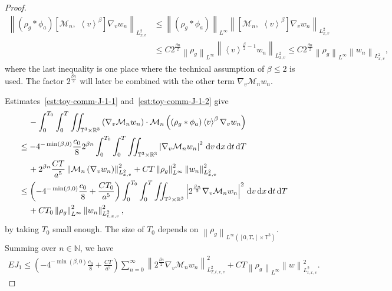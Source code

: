 \documentclass[11pt,american, reqno]{amsart}
\numberwithin{equation}{section}
\newcommand{\N}{\mathbb N}
\newcommand{\R}{\mathbb R}
\newcommand{\1}{\mathds{1}}
\newcommand{\dt}{\, {\rm d} t}
\newcommand{\dT}{\, {\rm d} T}
\newcommand{\dv}{\, {\rm d} v}
\newcommand{\dx}{\, {\rm d} x}
\newcommand{\CalM}{\mathcal{M}}
\newcommand{\vpran}[1]{\left(#1\right)}
\newcommand{\nn}{\nonumber}
\newcommand{\norm}[1]{\left\lVert#1\right\rVert}
\newcommand{\abs}[1]{\left\vert#1\right\vert}
\newcommand{\vint}[1]{\left\langle#1\right\rangle}
\newcommand{\T}{\mathbb{T}}
\numberwithin{equation}{section}
\begin{document}
\begin{proof}
\begin{align} \label{est:toy-comm-J-1-2}
 \norm{\vpran{\rho_g \ast \phi_a} [\CalM_n, \,\, \vint{v}^\beta] \nabla_v w_n}_{L^2_{x,v}}
&\leq 
 \norm{\vpran{\rho_g \ast \phi_a}}_{L^\infty}
 \norm{[\CalM_n, \,\, \vint{v}^\beta] \nabla_v w_n}_{L^2_{x,v}}
\\
&\leq
 C 2^{\frac{\beta n}{2}} \norm{\rho_g}_{L^\infty}
 \norm{\vint{v}^{\frac{\beta}{2}-1}w_n}_{L^2_{x,v}}
\leq
  C 2^{\frac{\beta n}{2}} \norm{\rho_g}_{L^\infty}
\norm{w_n}_{L^2_{x,v}}, \nn
\end{align}
where the last inequality is one place where the technical assumption of $\beta \leq 2$ is used. The factor $2^{\frac{\beta n}{2}}$ will later be combined with the other term $\nabla_v \CalM_n w_n$.

Estimates~\eqref{est:toy-comm-J-1-1} and~\eqref{est:toy-comm-J-1-2} give
\begin{align} \label{est:toy-J-1}
& \quad \,
 - \int_0^{T_0} \int_0^T \iint_{\T^3 \times \R^3}
   \vpran{\nabla_v \CalM_n w_n} \cdot
\CalM_n \vpran{\vpran{\rho_g \ast \phi_a} \vint{v}^\beta \nabla_v w_n} \nn
\\
& \leq 
 - 4^{-\min(\beta, 0)} \frac{c_0}{8} 2^{\beta n}
   \int_0^{T_0} \int_0^T \iint_{\T^3 \times \R^3}
   \abs{\nabla_v \CalM_n w_n}^2 \dv \dx \dt \dT \nn
\\
& \quad \,
 + 2^{\beta n} 
 \frac{C T}{a^5} \norm{\CalM_n \vpran{\nabla_v w_n}}_{L^2_{x, v}}^2
 + C T \norm{\rho_g}_{L^\infty}^2
 \norm{w_n}^2_{L^2_{x,v}} \nn
\\
& \leq 
 \vpran{- 4^{-\min(\beta, 0)} \frac{c_0}{8} 
 + \frac{C T_0}{a^5}}
   \int_0^{T_0} \int_0^T \iint_{\T^3 \times \R^3}
   \abs{2^{\frac{\beta n}{2}}\nabla_v \CalM_n w_n}^2 \dv \dx \dt \dT \nn
\\
& \quad \,
+ C T_0 \norm{\rho_g}_{L^\infty}^2
 \norm{w_n}^2_{L^2_{t,x,v}}, 
\end{align}
by taking $T_0$ small enough. The size of $T_0$ depends on $\norm{\rho_g}_{L^\infty([0, T_\ast] \times \T^3)}$. Summing over $n \in \N$, we have
\begin{align} \label{est:EJ-1}
 EJ_1
\leq
\vpran{- 4^{-\min(\beta, 0)} \frac{c_0}{8}
+ \frac{C T}{a^5}} \sum_{n=0}^\infty
 \norm{2^{\frac{\beta n}{2}} \nabla_v \CalM_n w_n}_{L^2_{T,t,x,v}}^2
+ C T \norm{\rho_g}_{L^\infty}
 \norm{w}^2_{L^2_{t,x,v}}. 
\end{align}

\smallskip



\end{proof}
\end{document}
